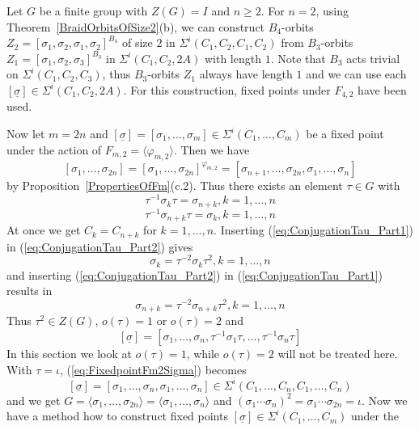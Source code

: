 \documentclass[12pt,a4paper]{article}
\numberwithin{equation}{section}
\numberwithin{table}{section}
\begin{document}
Let $G$ be a finite group with $Z(G)=I$ and $n \geq 2$.
For $n=2$, using Theorem~\ref{BraidOrbitsOfSize2}(b), we can construct
$B_4$-orbits $Z_2 = [\sigma_1, \sigma_2, \sigma_1, \sigma_2]^{B_4}$ of size $2$ in $\Sigma^i(C_1,C_2,C_1,C_2)$ 
from $B_3$-orbits $Z_1 = [\sigma_1, \sigma_2, \sigma_3]^{B_3}$ in $\Sigma^i(C_1,C_2,2A)$ with length $1$.
Note that $B_3$ acts trivial on $\Sigma^i(C_1,C_2,C_3)$, thus $B_3$-orbits $Z_1$ always have length $1$
and we can use each $[\underline{\sigma}] \in \Sigma^i(C_1,C_2,2A)$.
For this construction, fixed points under $F_{4,2}$ have been used.
\par
\noindent
Now let $m=2n$ and $[\underline{\sigma}] = [\sigma_1, \dots, \sigma_m] \in \Sigma^i(C_1,\dots,C_m)$ be a fixed point under 
the action of $F_{m,2} = \langle \varphi_{m,2} \rangle$. Then we have
$$[\sigma_1, \dots, \sigma_{2n}] = [\sigma_1, \dots, \sigma_{2n}]^{\varphi_{m,2}} =
[\sigma_{n+1}, \dots,\sigma_{2n},\sigma_1, \dots, \sigma_n]$$
by Proposition~\ref{PropertiesOfFm}(c.2). Thus there exists an element $\tau \in G$ with
\begin{equation} 
\label{eq:ConjugationTau_Part1}
\tau^{-1} \sigma_k \tau = \sigma_{n+k}, k=1,\dots,n
\end{equation}
\begin{equation}
\label{eq:ConjugationTau_Part2}
\tau^{-1} \sigma_{n+k} \tau = \sigma_k, k=1,\dots,n
\end{equation}
At once we get $C_k = C_{n+k}$ for $k=1,\dots,n$.
Inserting (\ref{eq:ConjugationTau_Part1}) in (\ref{eq:ConjugationTau_Part2}) gives
$$\sigma_k = \tau^{-2} \sigma_k \tau^2, k=1,\dots,n$$
and inserting (\ref{eq:ConjugationTau_Part2}) in (\ref{eq:ConjugationTau_Part1}) results in
$$\sigma_{n+k} = \tau^{-2} \sigma_{n+k} \tau^2, k=1,\dots,n$$
Thus $\tau^2 \in Z(G)$, $o(\tau) = 1$ or $o(\tau) = 2$ and
\begin{equation} 
\label{eq:FixedpointFm2Sigma}
[\underline{\sigma}] = [\sigma_1, \dots, \sigma_n, \tau^{-1} \sigma_1 \tau, \dots, \tau^{-1} \sigma_n \tau]
\end{equation}
In this section we look at $o(\tau) = 1$, while $o(\tau) = 2$ will not be treated here.
With $\tau = \iota$, (\ref{eq:FixedpointFm2Sigma}) becomes
$$[\underline{\sigma}] = [\sigma_1, \dots, \sigma_n, \sigma_1, \dots, \sigma_n] \in \Sigma^i(C_1,\dots,C_n,C_1,\dots,C_n)$$
and we get $G = \langle \sigma_1, \dots, \sigma_{2n} \rangle = \langle \sigma_1, \dots, \sigma_n \rangle$ 
and $(\sigma_1 \cdots \sigma_n)^2 = \sigma_1 \cdots \sigma_{2n} = \iota$.
Now we have a method how to construct fixed points $[\underline{\sigma}] \in \Sigma^i(C_1,\dots,C_m)$ under the
\end{document}
